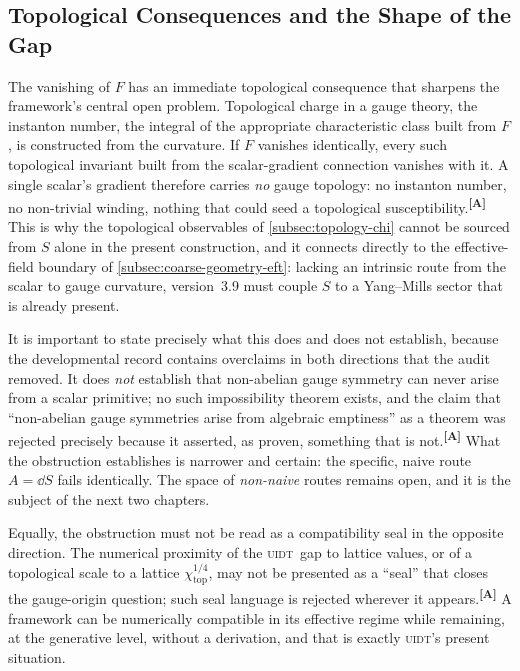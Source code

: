 \documentclass[12pt,a4paper,twoside]{article}
\theoremstyle{plain}
\theoremstyle{definition}
\theoremstyle{remark}
\newcommand{\UIDT}{\textsc{uidt}}
\newcommand{\catmark}[1]{\textsuperscript{\textsf{\textbf{[#1]}}}}
\begin{document}
\subsection{Topological Consequences and the Shape of the Gap}
\label{subsec:topological-consequences}

The vanishing of $F$ has an immediate topological consequence that sharpens the framework's central open problem. Topological charge in a gauge theory, the instanton number, the integral of the appropriate characteristic class built from $F$, is constructed from the curvature. If $F$ vanishes identically, every such topological invariant built from the scalar-gradient connection vanishes with it. A single scalar's gradient therefore carries \emph{no} gauge topology: no instanton number, no non-trivial winding, nothing that could seed a topological susceptibility.\catmark{A} This is why the topological observables of \cref{subsec:topology-chi} cannot be sourced from $S$ alone in the present construction, and it connects directly to the effective-field boundary of \cref{subsec:coarse-geometry-eft}: lacking an intrinsic route from the scalar to gauge curvature, version~3.9 must couple $S$ to a Yang--Mills sector that is already present.

It is important to state precisely what this does and does not establish, because the developmental record contains overclaims in both directions that the audit removed. It does \emph{not} establish that non-abelian gauge symmetry can never arise from a scalar primitive; no such impossibility theorem exists, and the claim that ``non-abelian gauge symmetries arise from algebraic emptiness'' as a theorem was rejected precisely because it asserted, as proven, something that is not.\catmark{A} What the obstruction establishes is narrower and certain: the specific, naive route $A = \dd S$ fails identically. The space of \emph{non-naive} routes remains open, and it is the subject of the next two chapters.

Equally, the obstruction must not be read as a compatibility seal in the opposite direction. The numerical proximity of the \UIDT\ gap to lattice values, or of a topological scale to a lattice $\chi_{\mathrm{top}}^{1/4}$, may not be presented as a ``seal'' that closes the gauge-origin question; such seal language is rejected wherever it appears.\catmark{A} A framework can be numerically compatible in its effective regime while remaining, at the generative level, without a derivation, and that is exactly \UIDT's present situation.
\end{document}

